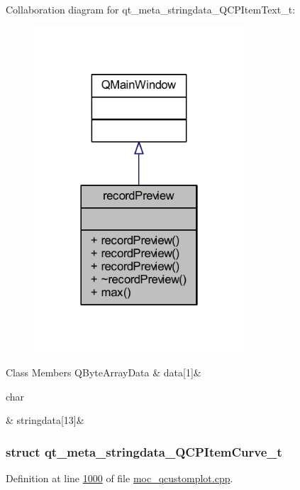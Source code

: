 Collaboration diagram for qt\+\_\+meta\+\_\+stringdata\+\_\+\+Q\+C\+P\+Item\+Text\+\_\+t\+:
\nopagebreak
\begin{figure}[H]
\begin{center}
\leavevmode
\includegraphics[width=222pt]{da/d50/a00301}
\end{center}
\end{figure}
\begin{DoxyFields}{Class Members}
\hypertarget{a00067_ae37b5edc1ab54bceebcfba0fb33002ec}{Q\+Byte\+Array\+Data}\label{a00067_ae37b5edc1ab54bceebcfba0fb33002ec}
&
data\mbox{[}1\mbox{]}&
\\
\hline

\hypertarget{a00067_aff2bfa25f79dd85cdbd854d9e51371a9}{char}\label{a00067_aff2bfa25f79dd85cdbd854d9e51371a9}
&
stringdata\mbox{[}13\mbox{]}&
\\
\hline

\end{DoxyFields}
\label{d8/d72/a00199}
\hypertarget{a00067_d8/d72/a00199}{}
\subsubsection{struct qt\+\_\+meta\+\_\+stringdata\+\_\+\+Q\+C\+P\+Item\+Curve\+\_\+t}


Definition at line \hyperlink{a00067_source_l01000}{1000} of file \hyperlink{a00067_source}{moc\+\_\+qcustomplot.\+cpp}.



